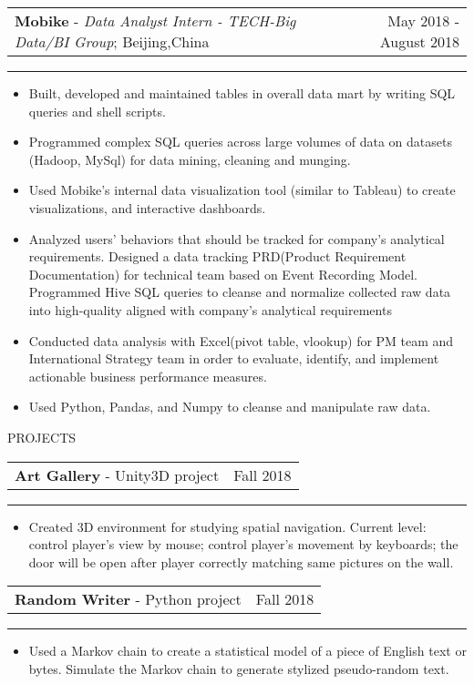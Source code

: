 \documentclass[letter,10.9pt]{article}
\makeatletter
\renewcommand{\section}{\@startsection
  {section}
  {12}
  {\z@}
  {0.1\baselineskip}
  {0.1\baselineskip}
  {\ruled@title}}
\newcommand{\ruled@title}[1]{
  \normalfont\large\scshape\bfseries #1\vskip2pt\hrule\vspace{0pt}}
\newcommand{\resentry}[4]{
  \begin{minipage}[t]{\linewidth}
    \setlength\tabcolsep{0pt}
    \begin{tabular*}{\linewidth}{l@{\extracolsep{\fill}}r@{}}
      \textbf{#1} - #2 & #3 \\
    \end{tabular*}
    \rule{3pt}{0pt}
	#4
  \end{minipage}
}
\newcommand{\resentryproj}[5]{
  \begin{minipage}[t]{\linewidth}
    \setlength\tabcolsep{0pt}
    \begin{tabular*}{\linewidth}{l@{\extracolsep{\fill}}r@{}}
      \textbf{#1} #2 - #3 & #4 \\
    \end{tabular*}
    \rule{3pt}{0pt}
	#5
  \end{minipage}
}
\newenvironment{resitemize}
{\vspace{-10pt}
\begin{itemize}
\setlength{\parskip}{0ex}
\setlength{\leftskip}{-14pt}}
{\end{itemize}}
\makeatother
\begin{document}
\resentry
{Mobike}
{\emph{Data Analyst Intern - TECH-Big Data/BI Group}; Beijing,China}
{May 2018 - August 2018}
{
\begin{resitemize}
\item Built, developed and maintained tables in overall data mart by writing SQL queries and shell scripts.
\item Programmed complex SQL queries across large volumes of data on datasets (Hadoop, MySql) for data mining, cleaning and munging. 
\item Used Mobike’s internal data visualization tool (similar to Tableau) to create visualizations, and interactive dashboards.
\item Analyzed users' behaviors that should be tracked for company’s analytical requirements. Designed a data tracking PRD(Product Requirement Documentation) for technical team  based on Event Recording Model. Programmed Hive SQL queries to cleanse and normalize collected raw data into high-quality aligned with company’s analytical requirements
\item Conducted data analysis with Excel(pivot table, vlookup) for PM team and International Strategy team in order to evaluate, identify, and implement actionable business performance measures.
\item Used Python, Pandas, and Numpy to cleanse and manipulate raw data.
\end{resitemize}
}


\section{PROJECTS}
\resentryproj
{Art Gallery}
{}
{Unity3D project}
{Fall 2018}
{
\begin{resitemize}
\item Created 3D environment for studying spatial navigation. Current level: control player's view by mouse; control player's movement by keyboards; the door will be open after player correctly matching same pictures on the wall.
\end{resitemize}
}
 
\resentryproj
{Random Writer}
{}
{Python project}
{Fall 2018}
{
\begin{resitemize}
\item Used a Markov chain to create a statistical model of a piece of English text or bytes. Simulate the Markov chain to generate stylized pseudo-random text. 
\end{resitemize}
}
 
\end{document}
